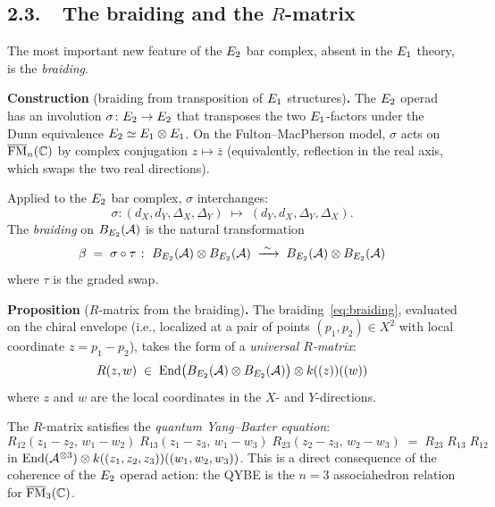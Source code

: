 \subsection*{2.3.\ \ The braiding and the $R$-matrix}

The most important new feature of the $E_2$ bar complex, absent in
the $E_1$ theory, is the \emph{braiding}.

\medskip
\noindent\textbf{Construction} (braiding from transposition of $E_1$ structures)\textbf{.}\;
The $E_2$ operad has an involution $\sigma\colon E_2 \to E_2$
that transposes the two $E_1$-factors under the Dunn equivalence
$E_2 \simeq E_1 \otimes E_1$. On the Fulton--MacPherson model,
$\sigma$ acts on $\overline{\mathrm{FM}}_n(\mathbb{C})$ by complex conjugation
$z \mapsto \bar{z}$ (equivalently, reflection in the real axis, which
swaps the two real directions).

Applied to the $E_2$ bar complex, $\sigma$ interchanges:
\[
 \sigma\colon (d_X, d_Y, \Delta_X, \Delta_Y)
 \;\longmapsto\;
 (d_Y, d_X, \Delta_Y, \Delta_X).
\]
The \emph{braiding} on $B_{E_2}(\mathcal{A})$ is the natural transformation
\begin{equation}\label{eq:braiding}
 \beta \;=\; \sigma \circ \tau
 \;\colon\;
 B_{E_2}(\mathcal{A}) \otimes B_{E_2}(\mathcal{A})
 \;\xrightarrow{\;\sim\;}\;
 B_{E_2}(\mathcal{A}) \otimes B_{E_2}(\mathcal{A})
\end{equation}
where $\tau$ is the graded swap.

\medskip
\noindent\textbf{Proposition} ($R$-matrix from the braiding)\textbf{.}\;
The braiding~\eqref{eq:braiding}, evaluated on the chiral
envelope (i.e., localized at a pair of points $(p_1, p_2) \in X^2$
with local coordinate $z = p_1 - p_2$), takes the form of a
\emph{universal $R$-matrix}:
\begin{equation}\label{eq:R-matrix}
 R(z, w) \;\in\;
 \mathrm{End}\bigl(B_{E_2}(\mathcal{A}) \otimes B_{E_2}(\mathcal{A})\bigr)
 \otimes k((z))((w))
\end{equation}
where $z$ and $w$ are the local coordinates in the $X$- and
$Y$-directions.

The $R$-matrix satisfies the \emph{quantum Yang--Baxter equation}:
\begin{equation}\label{eq:qybe}
 R_{12}(z_1 - z_2,\, w_1 - w_2)\;
 R_{13}(z_1 - z_3,\, w_1 - w_3)\;
 R_{23}(z_2 - z_3,\, w_2 - w_3)
 \;=\;
 R_{23}\; R_{13}\; R_{12}
\end{equation}
in $\mathrm{End}(\mathcal{A}^{\otimes 3}) \otimes k((z_1, z_2, z_3))((w_1, w_2, w_3))$.
This is a direct consequence of the coherence of the $E_2$ operad
action: the QYBE is the $n = 3$ associahedron relation for
$\overline{\mathrm{FM}}_3(\mathbb{C})$.

